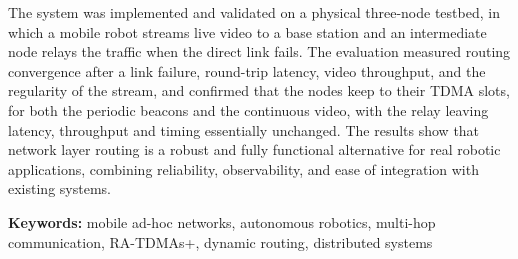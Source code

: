 The system was implemented and validated on a physical three-node testbed, in
which a mobile robot streams live video to a base station and an intermediate node
relays the traffic when the direct link fails. The evaluation measured routing
convergence after a link failure, round-trip latency, video throughput, and the
regularity of the stream, and confirmed that the nodes keep to their TDMA slots,
for both the periodic beacons and the continuous video, with the relay leaving
latency, throughput and timing essentially unchanged. The results show that
network layer routing is a robust and fully functional alternative for real
robotic applications, combining reliability, observability, and ease of
integration with existing systems.

\textbf{Keywords:} mobile ad-hoc networks, autonomous robotics, multi-hop
communication, RA-TDMAs+, dynamic routing, distributed systems
